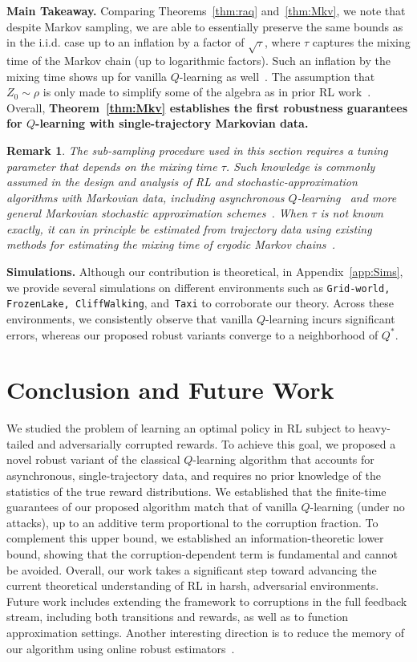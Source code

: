 \documentclass{article}
\newtheorem{remark}{Remark}
\begin{document}
\textbf{Main Takeaway.} Comparing Theorems~\ref{thm:raq} and~\ref{thm:Mkv}, we note that despite Markov sampling, we are able to essentially preserve the same bounds as in the i.i.d. case up to an inflation by a factor of $\sqrt{\tau}$, where $\tau$ captures the mixing time of the Markov chain (up to logarithmic factors). Such an inflation by the mixing time shows up for vanilla \(Q\)-learning as well~\cite{Qu}. The assumption that $Z_0 \sim \rho$ is only made to simplify some of the algebra as in prior RL work~\cite{bhandari_finite, dorfman}. Overall, \textbf{Theorem~\ref{thm:Mkv} establishes the first robustness guarantees for \(Q\)-learning with single-trajectory Markovian data.} 

\begin{remark}
\emph{The sub-sampling procedure used in this section requires a tuning parameter that depends on the mixing time \(\tau\). Such knowledge is commonly assumed in the design and analysis of RL and stochastic-approximation algorithms with Markovian data, including asynchronous \(Q\)-learning~\cite{Qu,li2024q} and more general Markovian stochastic approximation schemes~\cite{srikant,chen2022Auto,patil2023,mitra2024simple}. When \(\tau\) is not known exactly, it can in principle be estimated from trajectory data using existing methods for estimating the mixing time of ergodic Markov chains~\cite{wolfer2019estimating,hsu2015mixing}.}
\end{remark}

\textbf{Simulations.} Although our contribution is theoretical, in Appendix~\ref{app:Sims}, we provide several simulations on different environments such as \texttt{Grid-world, FrozenLake, CliffWalking}, and~\texttt{Taxi} to corroborate our theory. Across these environments, we consistently observe that vanilla \(Q\)-learning incurs significant errors, whereas our proposed robust variants converge to a neighborhood of $Q^*$. 

\section{Conclusion and Future Work}
We studied the problem of learning an optimal policy in RL subject to heavy-tailed and adversarially corrupted rewards. To achieve this goal, we proposed a novel robust variant of the classical \(Q\)-learning algorithm that accounts for asynchronous, single-trajectory data, and requires no prior knowledge
of the statistics of the true reward distributions. We established that the finite-time guarantees of our proposed algorithm match that of vanilla \(Q\)-learning (under no attacks), up to an additive term proportional to the corruption fraction. To complement this upper bound, we established an
information-theoretic lower bound, showing that the corruption-dependent term is fundamental and cannot be avoided. Overall, our work takes a significant step toward advancing the current theoretical understanding of RL in harsh, adversarial environments. Future work includes extending the framework to corruptions in the full feedback stream, including both transitions and rewards, as well as to function approximation settings. Another interesting direction is to reduce the memory of our algorithm using online robust estimators~\cite{shreyas2022robust}.
\end{document}
